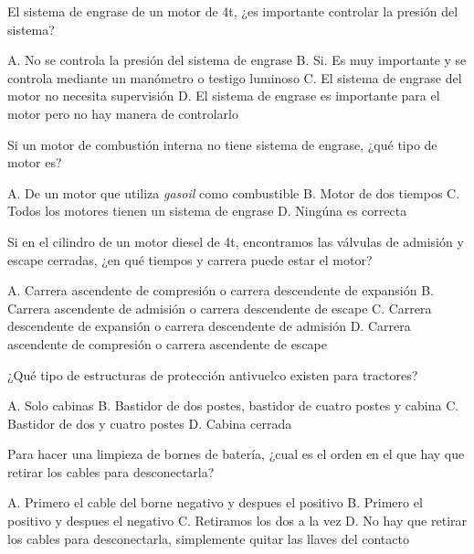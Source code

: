\documentclass[11pt]{exam}
\begin{document}
{\begin{questions}
\question El sistema de engrase de un motor de 4t, ¿es importante controlar la presión del sistema?
\begin{checkboxes}
\choice A. No se controla la presión del sistema de engrase
\CorrectChoice B. Si. Es muy importante y se controla mediante un manómetro o testigo luminoso
\choice C. El sistema de engrase del motor no necesita supervisión
\choice D. El sistema de engrase es importante para el motor pero no hay manera de controlarlo
\end{checkboxes}

\question Si un motor de combustión interna no tiene sistema de engrase, ¿qué tipo de motor es?
\begin{checkboxes}
\choice A. De un motor que utiliza \emph{gasoil} como combustible
\CorrectChoice B. Motor de dos tiempos
\choice C. Todos los motores tienen un sistema de engrase
\choice D. Ningúna es correcta
\end{checkboxes}

\question Si en el cilindro de un motor diesel de 4t, encontramos las válvulas
  de admisión y escape cerradas, ¿en  qué tiempos y carrera puede estar el
  motor? 
\begin{checkboxes}
\CorrectChoice A. Carrera ascendente de compresión o carrera descendente de expansión 
\choice B. Carrera ascendente de admisión o carrera descendente de escape
\choice C. Carrera descendente de expansión o carrera descendente de admisión
\choice D. Carrera ascendente de compresión o carrera ascendente de escape
\end{checkboxes}

\question ¿Qué tipo de estructuras de protección antivuelco existen para tractores?
\begin{checkboxes}
\choice A. Solo cabinas
\CorrectChoice B. Bastidor de dos postes, bastidor de cuatro postes y cabina
\choice C. Bastidor de dos y cuatro postes
\choice D. Cabina cerrada
\end{checkboxes}

\question Para hacer una limpieza de bornes de batería, ¿cual es el orden en el
  que hay que retirar los cables para desconectarla? 
\begin{checkboxes}
\CorrectChoice A. Primero el cable del borne negativo y despues el positivo
\choice B. Primero el positivo y despues el negativo
\choice C. Retiramos los dos a la vez
\choice D. No hay que retirar los cables para desconectarla, simplemente quitar
las llaves del contacto 
\end{checkboxes}


\end{questions}}
\end{document}
